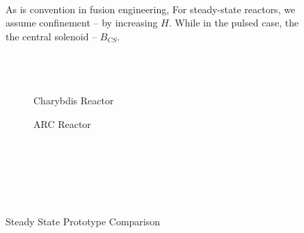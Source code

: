 \begin{figure}[b!]
\centering

\caption{} ~ \\
\small As is convention in fusion engineering,  For steady-state reactors, we assume  confinement -- by increasing $H$. While in the pulsed case, the  the central solenoid -- $B_{CS}$. ~ \\ ~ \\ ~ \\ ~ \\
\label{fig:selection}
\end{figure}

\clearpage

\newpage

\begin{figure*}[t!]
    \centering
    \hfill
    \begin{subfigure}[t]{0.45\textwidth}
        \centering
    \begin{adjustbox}{width=\textwidth}
      \Large
      
    \end{adjustbox}
        \caption{Charybdis Reactor}
    \end{subfigure}
    \hfill
    \begin{subfigure}[t]{0.45\textwidth}
        \centering
    \begin{adjustbox}{width=\textwidth}
      \Large
      
    \end{adjustbox}
        \caption{ARC Reactor}
    \end{subfigure}
    \hfill \hfill ~\\ ~\\ ~\\
    \caption{Steady State Prototype Comparison} ~\\
    \label{fig:charybdis}
\end{figure*}

